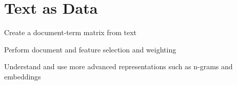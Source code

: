 \chapter{Text as Data}
\label{chap:dtm}

\begin{abstract}{Abstract}
  This chapter shows how you can analyze texts that are stored as a data frame column or variable using functions from the package  in R and the package  in Python and R.
  Please see  for more information on reading and cleaning text.
  
\end{abstract}


\begin{objectives}
\item Create a document-term matrix from text
\item Perform  document and feature selection and weighting
\item Understand and use more advanced representations such as n-grams and embeddings
\end{objectives}





